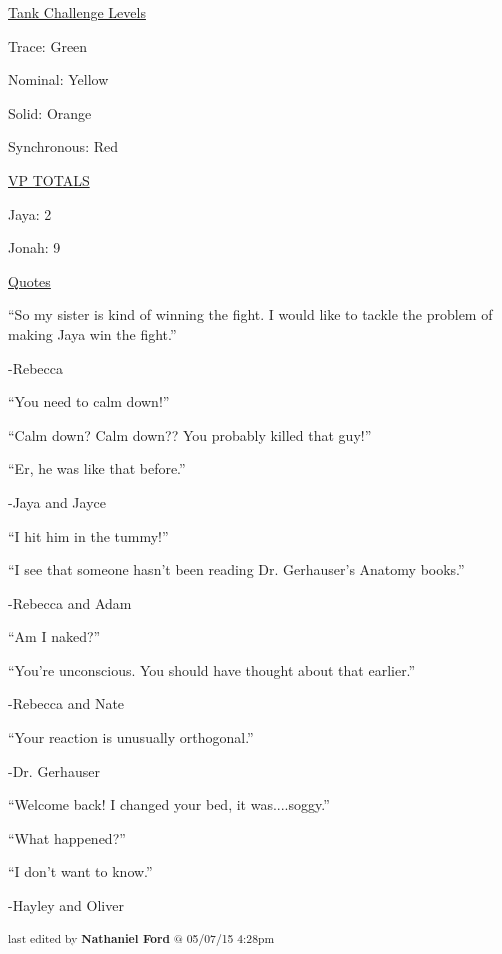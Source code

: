 \underline{  {\LARGE Tank Challenge Levels }  }

Trace: Green

Nominal: Yellow

Solid: Orange

Synchronous: Red



\underline{  {\LARGE VP TOTALS }  }

Jaya: 2

Jonah: 9



\underline{  {\LARGE Quotes }  }



``So my sister is kind of winning the fight.  I would like to tackle the problem of making Jaya win the fight.''

        -Rebecca



``You need to calm down!'' 

``Calm down?  Calm down??  You probably killed that guy!''

``Er, he was like that before.''

        -Jaya and Jayce



``I hit him in the tummy!''

``I see that someone hasn't been reading Dr. Gerhauser's Anatomy books.''

        -Rebecca and Adam



``Am I naked?''

``You're unconscious.  You should have thought about that earlier.''

        -Rebecca and Nate



``Your reaction is unusually orthogonal.''

        -Dr. Gerhauser



``Welcome back!  I changed your bed, it was....soggy.''

``What happened?''

``I don't want to know.''

        -Hayley and Oliver



\vspace{\fill}

\begin{flushright}
\textsubscript{last edited by \textbf{Nathaniel Ford} @ 05/07/15 4:28pm}
\end{flushright}

